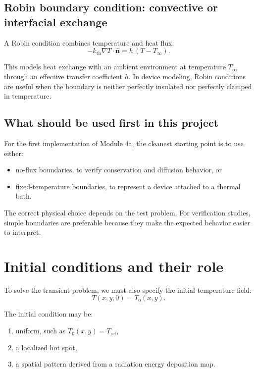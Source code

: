 \documentclass[11pt]{article}
\newcommand{\nvec}{\hat{\mathbf{n}}}
\newcommand{\kth}{k_{\mathrm{th}}}
\begin{document}
\subsection{Robin boundary condition: convective or interfacial exchange}

A Robin condition combines temperature and heat flux:
\begin{equation}
-\kth \nabla T \cdot \nvec = h\,(T - T_\infty).
\end{equation}

This models heat exchange with an ambient environment at temperature $T_\infty$ through an effective transfer coefficient $h$. In device modeling, Robin conditions are useful when the boundary is neither perfectly insulated nor perfectly clamped in temperature.

\subsection{What should be used first in this project}

For the first implementation of Module 4a, the cleanest starting point is to use either:
\begin{itemize}
    \item no-flux boundaries, to verify conservation and diffusion behavior, or
    \item fixed-temperature boundaries, to represent a device attached to a thermal bath.
\end{itemize}

The correct physical choice depends on the test problem. For verification studies, simple boundaries are preferable because they make the expected behavior easier to interpret.

\section{Initial conditions and their role}

To solve the transient problem, we must also specify the initial temperature field:
\begin{equation}
T(x,y,0) = T_0(x,y).
\end{equation}

The initial condition may be:
\begin{enumerate}[label=\arabic*.]
    \item uniform, such as $T_0(x,y)=T_{\mathrm{ref}}$,
    \item a localized hot spot,
    \item a spatial pattern derived from a radiation energy deposition map.
\end{enumerate}
\end{document}
